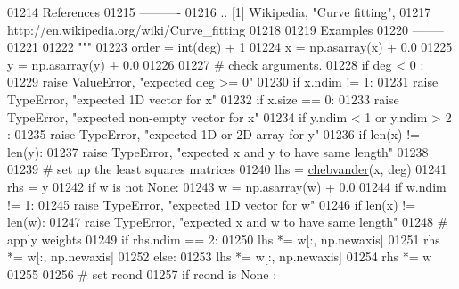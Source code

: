 \begin{DoxyCode}
01214 \textcolor{stringliteral}{    References}
01215 \textcolor{stringliteral}{    ----------}
01216 \textcolor{stringliteral}{    .. [1] Wikipedia, "Curve fitting",}
01217 \textcolor{stringliteral}{           http://en.wikipedia.org/wiki/Curve\_fitting}
01218 \textcolor{stringliteral}{}
01219 \textcolor{stringliteral}{    Examples}
01220 \textcolor{stringliteral}{    --------}
01221 \textcolor{stringliteral}{}
01222 \textcolor{stringliteral}{    """}
01223     order = int(deg) + 1
01224     x = np.asarray(x) + 0.0
01225     y = np.asarray(y) + 0.0
01226 
01227     \textcolor{comment}{# check arguments.}
01228     \textcolor{keywordflow}{if} deg < 0 :
01229         \textcolor{keywordflow}{raise} ValueError, \textcolor{stringliteral}{"expected deg >= 0"}
01230     \textcolor{keywordflow}{if} x.ndim != 1:
01231         \textcolor{keywordflow}{raise} TypeError, \textcolor{stringliteral}{"expected 1D vector for x"}
01232     \textcolor{keywordflow}{if} x.size == 0:
01233         \textcolor{keywordflow}{raise} TypeError, \textcolor{stringliteral}{"expected non-empty vector for x"}
01234     \textcolor{keywordflow}{if} y.ndim < 1 \textcolor{keywordflow}{or} y.ndim > 2 :
01235         \textcolor{keywordflow}{raise} TypeError, \textcolor{stringliteral}{"expected 1D or 2D array for y"}
01236     \textcolor{keywordflow}{if} len(x) != len(y):
01237         \textcolor{keywordflow}{raise} TypeError, \textcolor{stringliteral}{"expected x and y to have same length"}
01238 
01239     \textcolor{comment}{# set up the least squares matrices}
01240     lhs = \hyperlink{namespacepyneb_1_1utils_1_1chebyshev_aa9deae857486c8ee69362ded985b09d8}{chebvander}(x, deg)
01241     rhs = y
01242     \textcolor{keywordflow}{if} w \textcolor{keywordflow}{is} \textcolor{keywordflow}{not} \textcolor{keywordtype}{None}:
01243         w = np.asarray(w) + 0.0
01244         \textcolor{keywordflow}{if} w.ndim != 1:
01245             \textcolor{keywordflow}{raise} TypeError, \textcolor{stringliteral}{"expected 1D vector for w"}
01246         \textcolor{keywordflow}{if} len(x) != len(w):
01247             \textcolor{keywordflow}{raise} TypeError, \textcolor{stringliteral}{"expected x and w to have same length"}
01248         \textcolor{comment}{# apply weights}
01249         \textcolor{keywordflow}{if} rhs.ndim == 2:
01250             lhs *= w[:, np.newaxis]
01251             rhs *= w[:, np.newaxis]
01252         \textcolor{keywordflow}{else}:
01253             lhs *= w[:, np.newaxis]
01254             rhs *= w
01255 
01256     \textcolor{comment}{# set rcond}
01257     \textcolor{keywordflow}{if} rcond \textcolor{keywordflow}{is} \textcolor{keywordtype}{None} :

\end{DoxyCode}
